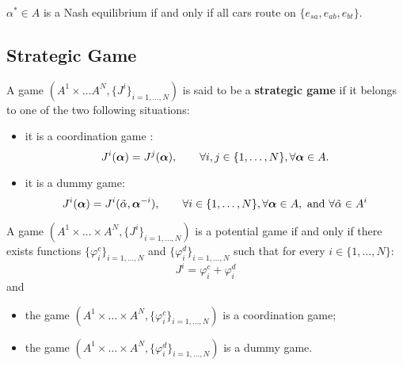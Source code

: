 \begin{lemma}
	$ \alpha^* \in A $ is a Nash equilibrium if and only if all cars route on $\{e_{sa}, e_{ab}, e_{bt} \} $.
\end{lemma}


\subsection{Strategic Game}

\begin{definition}
	A game  $(A^1 \times \ldots A^N, \{J^i\}_{i=1,\ldots,N})$ is said to be a \textbf{strategic game} if it belongs to one of the two following situations:
	\begin{itemize}
		\item it is a coordination game :
		\begin{equation}
			J^i(\boldsymbol{\alpha}) = J^j(\boldsymbol{\alpha}) ,\qquad \forall i,j \in \{1,\ldots, N\}, \forall \boldsymbol{\alpha} \in A.
		\end{equation}
		\item it is a dummy game:
		\begin{equation}
			J^{i}(\boldsymbol{\alpha}) = J^i(\tilde{\alpha}, \boldsymbol{\alpha}^{-i}), \qquad \forall i\in \{1,\ldots,N\}, \forall \boldsymbol{\alpha} \in A,\text{ and } \forall \tilde{\alpha} \in A^i
		\end{equation}
	\end{itemize} 
\end{definition}


\begin{proposition}
	A game $(A^1 \times \ldots \times A^N, \{J^i\}_{i=1,\ldots,N})$ is a potential game if and only if there exists functions $\{\varphi_i^c\}_{i=1,\ldots,N}$ and $\{\varphi_i^d\}_{i=1,\ldots,N}$ such that
	for every $i \in \{1,\ldots, N\}$:
	$$
		J^i = \varphi_i^c + \varphi_i^d
	$$
	and
	\begin{itemize}
		\item the game $(A^1 \times \ldots \times A^N, \{\varphi_i^c\}_{i=1,\ldots,N})$ is a coordination game;
		\item the game $(A^1 \times \ldots \times A^N, \{\varphi_i^d\}_{i=1,\ldots,N})$ is a dummy game.
	\end{itemize}
\label{prop:decomposition_potential_game}
\end{proposition}

